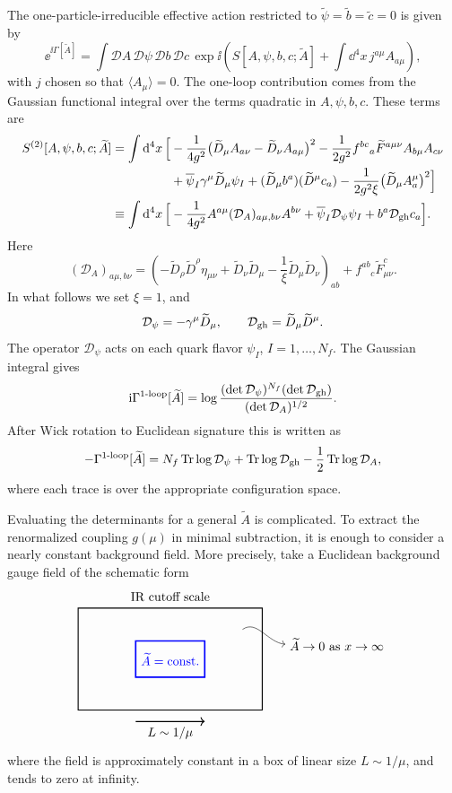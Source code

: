 The one-particle-irreducible effective action restricted to
\(\widetilde\psi=\widetilde b=\widetilde c=0\) is given by
\[
  \ee^{\ii\Gamma[\widetilde A]}
  =
  \int\mathcal DA\,\mathcal D\psi\,\mathcal Db\,\mathcal Dc\,
  \exp\ii\left(
    S[A,\psi,b,c;\widetilde A]
    +\int\dd^4x\,j^{a\mu}A_{a\mu}
  \right),
\]
with \(j\) chosen so that \(\langle A_\mu\rangle=0\).  The one-loop
contribution comes from the Gaussian functional integral over the terms
quadratic in \(A,\psi,b,c\).  These terms are
\[
\begin{aligned}
  S^{(2)}[A,\psi,b,c;\widetilde A]
  =
  \int\mathrm{d}^4x\,
  \Bigl[
    &-\frac{1}{4g^2}
    \bigl(
      \widetilde D_\mu A_{a\nu}
      -\widetilde D_\nu A_{a\mu}
    \bigr)^2
    -\frac{1}{2g^2}
      f^{bc}{}_{a}\widetilde F^{a\mu\nu}A_{b\mu}A_{c\nu}
\\
    &+\overline\psi_I\gamma^\mu\widetilde D_\mu\psi_I
    +(\widetilde D_\mu b^a)(\widetilde D^\mu c_a)
    -\frac{1}{2g^2\xi}
      \bigl(\widetilde D_\mu A_a^\mu\bigr)^2
  \Bigr]
\\
  \equiv
  \int\mathrm{d}^4x\,
  \Bigl[
    &-\frac{1}{4g^2}
      A^{a\mu}(\mathcal D_A)_{a\mu,b\nu}A^{b\nu}
    +\overline\psi_I\mathcal D_\psi\psi_I
    +b^a\mathcal D_{\rm gh}c_a
  \Bigr].
\end{aligned}
\]
Here
\[
  (\mathcal D_A)_{a\mu,b\nu}
  =
  \left(
    -\widetilde D_\rho\widetilde D^\rho\eta_{\mu\nu}
    +\widetilde D_\nu\widetilde D_\mu
    -\frac{1}{\xi}\widetilde D_\mu\widetilde D_\nu
  \right)_{ab}
  +f^{ab}{}_{c}\widetilde F^c_{\mu\nu}.
\]
In what follows we set \(\xi=1\), and
\[
  \mathcal D_\psi=-\gamma^\mu\widetilde D_\mu,
  \qquad
  \mathcal D_{\rm gh}=\widetilde D_\mu\widetilde D^\mu.
\]
The operator \(\mathcal D_\psi\) acts on each quark flavor
\(\psi_I\), \(I=1,\ldots,N_f\).  The Gaussian integral gives
\[
  \mathrm{i}\Gamma^{\text{1-loop}}[\widetilde A]
  =
  \log
  \frac{
    (\det\mathcal D_\psi)^{N_f}
    (\det\mathcal D_{\rm gh})
  }{
    (\det\mathcal D_A)^{1/2}
  }.
\]
After Wick rotation to Euclidean signature this is written as
\[
  -\Gamma^{\text{1-loop}}[\widetilde A]
  =
  N_f\operatorname{Tr}\log\mathcal D_\psi
  +\operatorname{Tr}\log\mathcal D_{\rm gh}
  -\frac{1}{2}\operatorname{Tr}\log\mathcal D_A,
\]
where each trace is over the appropriate configuration space.

Evaluating the determinants for a general \(\widetilde A\) is
complicated.  To extract the renormalized coupling \(g(\mu)\) in minimal
subtraction, it is enough to consider a nearly constant background field.
More precisely, take a Euclidean background gauge field of the schematic
form
\[
\begin{tikzpicture}[scale=0.92,baseline={(0,-0.25)}]
  \draw[thick] (-2.8,-1.55) rectangle (2.8,1.55);
  \draw[blue,very thick] (-1.05,-0.55) rectangle (1.05,0.55);
  \node[blue] at (0,0) {\(\widetilde A=\hbox{const.}\)};
  \draw[->,thick] (-1.05,-1.9) -- (1.05,-1.9);
  \node at (0,-2.25) {\(L\sim 1/\mu\)};
  \draw[->] (2.2,0.9) to[out=35,in=175] (3.5,0.45);
  \node[right] at (3.5,0.45) {\(\widetilde A\to0\) as \(x\to\infty\)};
  \node at (0,1.9) {IR cutoff scale};
\end{tikzpicture}
\]
where the field is approximately constant in a box of linear size
\(L\sim1/\mu\), and tends to zero at infinity.

